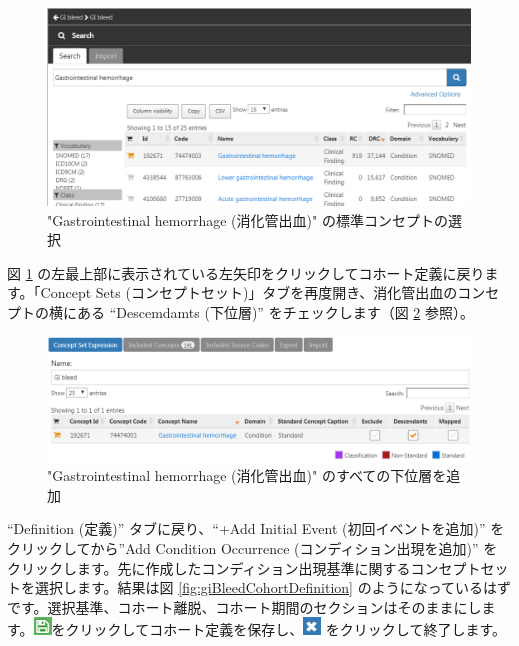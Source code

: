 \documentclass[
  11pt]{book}
\theoremstyle{definition}
\theoremstyle{definition}
\theoremstyle{definition}
\theoremstyle{definition}
\theoremstyle{remark}
\begin{document}
\begin{figure}

{\centering \includegraphics[width=1\linewidth]{images/SuggestedAnswers/giBleedSearch} 

}

\caption{"Gastrointestinal hemorrhage (消化管出血)" の標準コンセプトの選択}\label{fig:giBleedSearch}
\end{figure}

図 \ref{fig:giBleedSearch} の左最上部に表示されている左矢印をクリックしてコホート定義に戻ります。「Concept Sets (コンセプトセット)」タブを再度開き、消化管出血のコンセプトの横にある ``Descemdamts (下位層)'' をチェックします（図 \ref{fig:giBleedDescendants} 参照）。

\begin{figure}

{\centering \includegraphics[width=1\linewidth]{images/SuggestedAnswers/giBleedDescendants} 

}

\caption{"Gastrointestinal hemorrhage (消化管出血)" のすべての下位層を追加}\label{fig:giBleedDescendants}
\end{figure}

``Definition (定義)'' タブに戻り、``+Add Initial Event (初回イベントを追加)'' をクリックしてから''Add Condition Occurrence (コンディション出現を追加)'' をクリックします。先に作成したコンディション出現基準に関するコンセプトセットを選択します。結果は図 \ref{fig:giBleedCohortDefinition} のようになっているはずです。選択基準、コホート離脱、コホート期間のセクションはそのままにします。\includegraphics{images/Cohorts/save.png}をクリックしてコホート定義を保存し、\includegraphics{images/SuggestedAnswers/close.png} をクリックして終了します。
\end{document}
